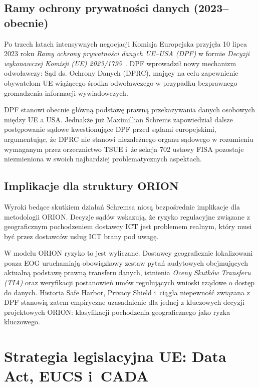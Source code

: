 \subsection{Ramy ochrony prywatności danych (2023–obecnie)}

Po trzech latach intensywnych negocjacji Komisja Europejska przyjęła 10 lipca 2023 roku \textit{Ramy ochrony prywatności danych UE–USA (DPF)} w formie \textit{Decyzji wykonawczej Komisji (UE) 2023/1795}~\autocite{KomisjaEuropejska2023DPF}. DPF wprowadził nowy mechanizm odwoławczy: Sąd ds. Ochrony Danych (DPRC), mający na celu zapewnienie obywatelom UE wiążącego środka odwoławczego w przypadku bezprawnego gromadzenia informacji wywiadowczych. 

DPF stanowi obecnie główną podstawę prawną przekazywania danych osobowych między UE a USA. Jednakże już Maximillian Schrems  zapowiedział dalsze postępowanie sądowe kwestionujące DPF przed sądami europejskimi, argumentując, że DPRC nie stanowi niezależnego organu sądowego w rozumieniu wymaganym przez orzecznictwo TSUE i~że sekcja 702 ustawy FISA pozostaje niezmieniona w swoich najbardziej problematycznych  aspektach. 

\subsection{Implikacje dla struktury ORION}

Wyroki bedące skutkiem działań Schremsa niosą bezpośrednie implikacje dla metodologii ORION. Decyzje sądów wskazują, że ryzyko regulacyjne związane z geograficznym pochodzeniem dostawcy ICT jest problemem realnym, który musi być przez dostawców usług ICT brany pod uwagę.

W modelu ORION ryzyko to jest wyliczane. Dostawcy geograficznie lokalizowani poaza EOG uruchamiają obowiązkowy zestaw pytań audytowych obejmujących aktualną podstawę prawną transferu danych, istnienia \textit{Oceny Skutków Transferu (\textit{TIA})} oraz weryfikacji postanowień umów regulujących wnioski rządowe o dostęp do danych. 
Historia Safe Harbor, Privacy Shield i~ciągła niepewność związana z DPF stanowią zatem empiryczne uzasadnienie dla jednej z kluczowych decyzji projektowych ORION: klasyfikacji pochodzenia geograficznego jako ryzka kluczowego.

\section{Strategia legislacyjna UE: Data Act, EUCS i~CADA}

